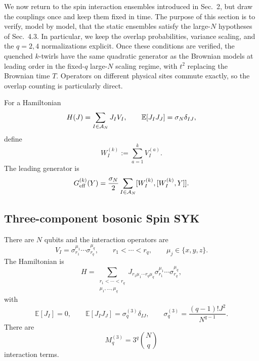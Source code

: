 \documentclass{article}
\theoremstyle{definition}
\begin{document}
We now return to the spin interaction ensembles introduced in Sec.~2, but
draw the couplings once and keep them fixed in time.  The purpose of this
section is to verify, model by model, that the static ensembles satisfy the
large-$N$ hypotheses of Sec.~4.3.  In particular, we keep the overlap
probabilities, variance scaling, and the $q=2,4$ normalizations explicit.
Once these conditions are verified, the quenched $k$-twirls have the same
quadratic generator as the Brownian models at leading order in the fixed-$q$
large-$N$ scaling regime, with $t^2$ replacing the Brownian time $T$.
Operators on different physical sites commute exactly, so the overlap
counting is particularly direct.

For a Hamiltonian
\begin{equation}
    H(J)=\sum_{I\in{\cal A}_N}J_IV_I,
    \qquad
    \mathbb E[J_IJ_J]=\sigma_N\delta_{IJ},
\end{equation}
define
\begin{equation}
    W_I^{(k)}:=\sum_{a=1}^kV_I^{(a)}.
\end{equation}
The leading generator is
\begin{equation}
    G_{\rm eff}^{(k)}(Y)
    =\frac{\sigma_N}{2}
    \sum_{I\in{\cal A}_N}
    [W_I^{(k)},[W_I^{(k)},Y]].
\end{equation}

\subsection{Three-component bosonic Spin SYK}

There are $N$ qubits and the interaction operators are
\begin{equation}
    V_I
    =\sigma_{r_1}^{\mu_1}\cdots\sigma_{r_q}^{\mu_q},
    \qquad
    r_1<\cdots<r_q,
    \qquad
    \mu_j\in\{x,y,z\}.
\end{equation}
The Hamiltonian is
\begin{equation}
    H
    =\sum_{\substack{r_1<\cdots<r_q\\
                      \mu_1,\ldots,\mu_q}}
    J_{r_1\mu_1\cdots r_q\mu_q}
    \sigma_{r_1}^{\mu_1}\cdots\sigma_{r_q}^{\mu_q},
\end{equation}
with
\begin{equation}
    \mathbb E[J_I]=0,
    \qquad
    \mathbb E[J_IJ_J]=\sigma_q^{(3)}\delta_{IJ},
    \qquad
    \sigma_q^{(3)}=\frac{(q-1)!J^2}{N^{q-1}}.
\end{equation}
There are
\begin{equation}
    M_q^{(3)}=3^q\binom Nq
\end{equation}
interaction terms.
\end{document}
